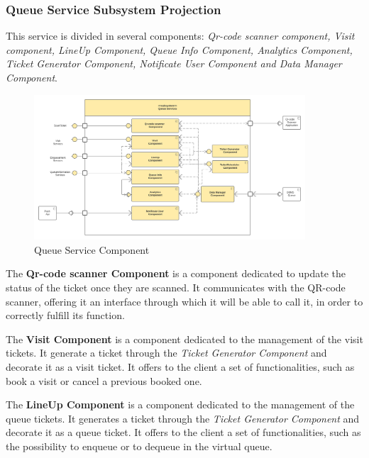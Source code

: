 \FloatBarrier

\subsubsection{Queue Service Subsystem Projection}
\label{subsubsect:queueservice}

This service is divided in several components: \textit{Qr-code scanner component, Visit component, LineUp Component, Queue Info Component, Analytics Component, Ticket Generator Component, Notificate User Component and Data Manager Component}. 

\begin{figure}[h!]
    \centering
    \includegraphics[width=0.9\textwidth]{Images/ComponentViewQueueService(1).png}
    \caption{\label{fig:ComponentViewQueueServices}{Queue Service Component}}
\end{figure}

\FloatBarrier

The \textbf{Qr-code scanner Component} is a component dedicated to update the status of the ticket once they are scanned. It communicates with the QR-code scanner, offering it an interface through which it will be able to call it, in order to correctly fulfill its function.

The \textbf{Visit Component} is a component dedicated to the management of the visit tickets. It generate a ticket through the \textit{Ticket Generator Component} and decorate it as a visit ticket. It offers to the client a set of functionalities, such as book a visit or cancel a previous booked one.

The \textbf{LineUp Component} is a component dedicated to the management of the queue tickets. It generates a ticket through the \textit{Ticket Generator Component} and decorate it as a queue ticket. It offers to the client a set of functionalities, such as the possibility to enqueue or to dequeue in the virtual queue.

